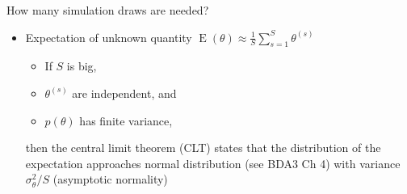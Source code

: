 \documentclass[english,t]{beamer}
\DeclareMathOperator{\E}{E}
\begin{document}
\begin{frame}{How many simulation draws are needed?}

  \vspace{-0.7\baselineskip}
  \begin{itemize}
  \item Expectation of unknown quantity $\E(\theta)\approx \frac{1}{S}\sum_{s=1}^S \theta^{(s)}$
    \begin{itemize}
    \item If $S$ is big,
    \item $\theta^{(s)}$ are independent, and 
    \item $p(\theta)$ has finite variance,
    \end{itemize}
    then the central limit theorem (CLT) states
    that the distribution of the expectation approaches normal
    distribution (see BDA3 Ch 4) with variance $\sigma^2_\theta/S$
    (asymptotic normality)

\end{itemize}
\end{frame}
\end{document}
